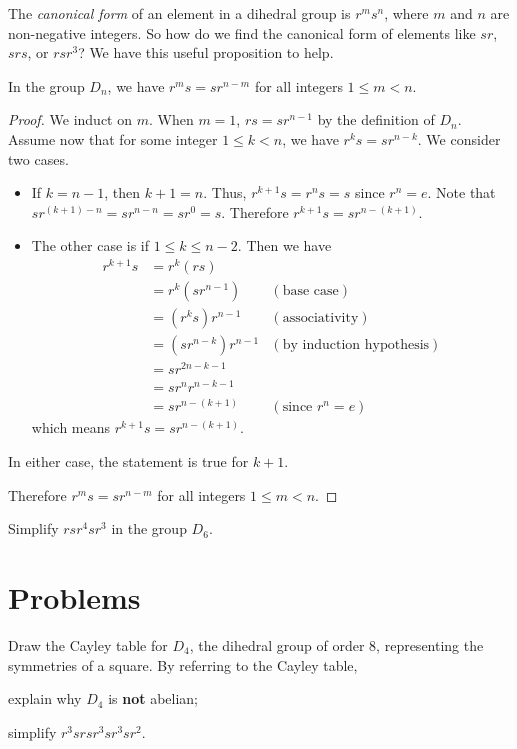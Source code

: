 The \textit{canonical form} of an element in a dihedral group is $r^ms^n$, where $m$ and $n$ are non-negative integers. So how do we find the canonical form of elements like $sr$, $srs$, or $rsr^3$? We have this useful proposition to help.
\begin{proposition}\label{prop-Dn-cannonical-form}
    In the group $D_n$, we have $r^ms = sr^{n-m}$ for all integers $1 \leq m < n$.
\end{proposition}
\begin{proof}
    We induct on $m$. When $m = 1$, $rs = sr^{n-1}$ by the definition of $D_n$. Assume now that for some integer $1 \leq k < n$, we have $r^ks = sr^{n-k}$. We consider two cases.
    \begin{itemize}
        \item If $k = n - 1$, then $k + 1 = n$. Thus, $r^{k+1}s = r^ns = s$ since $r^n = e$. Note that $sr^{(k+1)-n} = sr^{n-n} = sr^0 = s$. Therefore $r^{k+1}s = sr^{n-(k+1)}$.
        \item The other case is if $1 \leq k \leq n - 2$. Then we have
        \begin{align*}
            r^{k+1}s &= r^k(rs)\\
            &= r^k(sr^{n-1}) & (\text{base case})\\
            &= (r^ks)r^{n-1} & (\text{associativity})\\
            &= (sr^{n-k})r^{n-1} & (\text{by induction hypothesis})\\
            &= sr^{2n - k - 1}\\
            &= sr^nr^{n-k-1}\\
            &= sr^{n-(k+1)} & (\text{since } r^n = e)
        \end{align*}
        which means $r^{k+1}s = sr^{n-(k+1)}$.
    \end{itemize}
    In either case, the statement is true for $k+1$.

    Therefore $r^ms = sr^{n-m}$ for all integers $1 \leq m < n$.
\end{proof}

\begin{exercise}
    Simplify $rsr^4sr^3$ in the group $D_6$.
\end{exercise}

\newpage

\section{Problems}
\begin{problem}
    Draw the Cayley table for $D_4$, the dihedral group of order 8, representing the symmetries of a square.\newline
    By referring to the Cayley table,
    \begin{partquestions}{\alph*}
        \item explain why $D_4$ is \textbf{not} abelian;
        \item simplify $r^3srsr^3sr^3sr^2$.
    \end{partquestions}
\end{problem}

